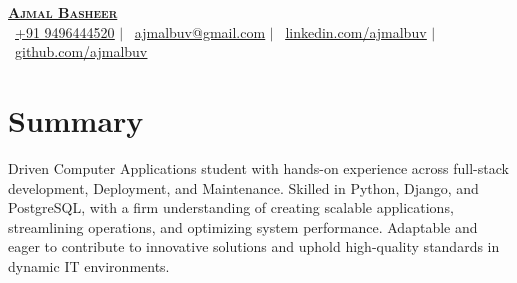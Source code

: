 \documentclass[a4paper,11pt]{article}
\begin{document}
	
	\begin{minipage}[c]{0.15\textwidth}
\end{minipage}
\begin{minipage}[t]{0.84\textwidth}  %
    \begin{center}
        {\selectfont \textbf{\Huge \scshape \href{https://ajmalbuv.github.io}{Ajmal Basheer}}} \\ \vspace{1pt}
        \small{
            \raisebox{-0.1\height}\faPhone\ \href{tel:+919496444520}{\underline{+91 9496444520}} $|$ 
            \raisebox{-0.2\height}\faEnvelope\ \href{mailto:ajmalbuv@gmail.com}{\underline{ajmalbuv@gmail.com}} $|$ 
            \raisebox{-0.2\height}\faLinkedin\ \href{https://linkedin.com/in/ajmalbuv}{\underline{linkedin.com/ajmalbuv}} $|$
            \raisebox{-0.2\height}\faGithub\ \href{https://github.com/ajmalbuv}{\underline{github.com/ajmalbuv}}
        }
    \end{center}
\end{minipage}


\section{Summary}
\begin{itemize}[leftmargin=0.15in, label={}]
  \small{\item{
        Driven Computer Applications student with hands-on experience across full-stack development, Deployment, and Maintenance. Skilled in Python, Django, and PostgreSQL, with a firm understanding of creating scalable applications, streamlining operations, and optimizing system performance. Adaptable and eager to contribute to innovative solutions and uphold high-quality standards in dynamic IT environments.
        }}
\end{itemize}
\end{document}
